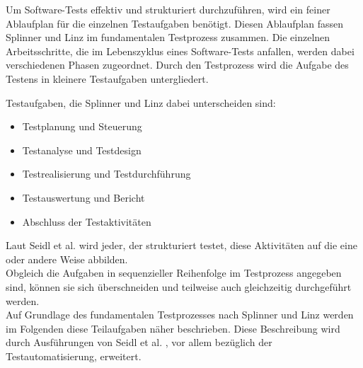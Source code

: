 Um Software-Tests effektiv und strukturiert durchzuführen, wird ein feiner Ablaufplan für die einzelnen Testaufgaben benötigt. Diesen Ablaufplan fassen Splinner und Linz \cite{spillner_basiswissen_2007} im fundamentalen Testprozess zusammen. Die einzelnen Arbeitsschritte, die im Lebenszyklus eines Software-Tests anfallen, werden dabei verschiedenen Phasen zugeordnet.
Durch den Testprozess wird die Aufgabe des Testens in kleinere Testaufgaben untergliedert.

Testaufgaben, die Splinner und Linz \cite{spillner_basiswissen_2007} dabei unterscheiden sind:

\begin{itemize}
	  \itemsep0pt
      \item Testplanung und Steuerung
      \item Testanalyse und Testdesign
      \item Testrealisierung und Testdurchführung
      \item Testauswertung und Bericht
      \item Abschluss der Testaktivitäten       
\end{itemize}

Laut Seidl et al. \cite[S. 9]{seidl_basiswissen_2012} wird jeder, der strukturiert testet, diese Aktivitäten auf die eine oder andere Weise abbilden.\\
\glqq Obgleich die Aufgaben in sequenzieller Reihenfolge im Testprozess angegeben sind, können sie sich überschneiden und teilweise auch gleichzeitig durchgeführt werden.\grqq\ \cite[S.19]{spillner_basiswissen_2007} \\ Auf Grundlage des fundamentalen Testprozesses nach Splinner und Linz \cite[S.20ff]{spillner_basiswissen_2007} werden im Folgenden diese Teilaufgaben näher beschrieben. 
Diese Beschreibung wird durch Ausführungen von Seidl et al. \cite[S. 9 ff.]{seidl_basiswissen_2012}, vor allem bezüglich der Testautomatisierung, erweitert. 

